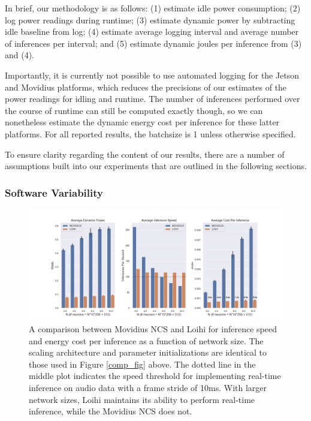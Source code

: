 \documentclass[sigconf, screen]{acmart}
\begin{document}
In brief, our methodology is as follows: (1) estimate idle power consumption; (2) log power readings during runtime; (3) estimate dynamic power by subtracting idle baseline from log; (4) estimate average logging interval and average number of inferences per interval; and (5) estimate dynamic joules per inference from (3) and (4).

Importantly, it is currently not possible to use automated logging for the Jetson and Movidius platforms, which reduces the precisions of our estimates of the power readings for idling and runtime. The number of inferences performed over the course of runtime can still be computed exactly though, so we can nonetheless estimate the dynamic energy cost per inference for these latter platforms. For all reported results, the batchsize is 1 unless otherwise specified.

To ensure clarity regarding the content of our results, there are a number of assumptions built into our experiments that are outlined in the following sections.

\subsubsection{Software Variability}

\begin{figure}[ht!]
\centering
    \includegraphics[width=6.7in]{./figures/movidius_summary.png}
	\caption{A comparison between Movidius NCS and Loihi for inference speed and energy cost per inference as a function of network size. The scaling architecture and parameter initializations are identical to those used in Figure \ref{comp_fig} above. The dotted line in the middle plot indicates the speed threshold for implementing real-time inference on audio data with a frame stride of 10ms. With larger network sizes, Loihi maintains its ability to perform real-time inference, while the Movidius NCS does not.}
\label{scaling_fig}
\end{figure}
\end{document}
